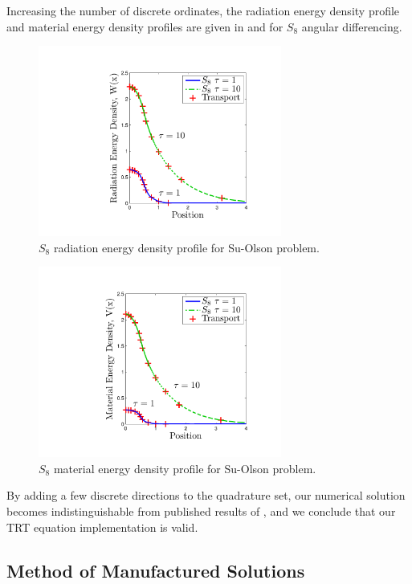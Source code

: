 Increasing the number of discrete ordinates, the radiation energy density profile and material energy density profiles are given in  and  for $S_8$ angular differencing.
\begin{figure}[!htp]
\centering
\includegraphics[width=8cm,trim=1.75in  0.5in 0.75in 0.5in,clip=true]{chapter6_grey_radtran/Dissertation_Data/Su_Olson_S8_Radiation_Energy.pdf}
\caption{$S_8$ radiation energy density profile for Su-Olson problem.}
\label{fig:su_olson_s8_rad}
\end{figure}
\begin{figure}[!htp]
\centering
\includegraphics[width=8cm,trim=1.75in  0.5in 0.75in 0.5in,clip=true]{chapter6_grey_radtran/Dissertation_Data/Su_Olson_S8_Material_Energy.pdf}
\caption{$S_8$ material energy density profile for Su-Olson problem.}
\label{fig:su_olson_s8_mat}
\end{figure}
By adding a few discrete directions to the quadrature set, our numerical solution becomes indistinguishable from published results of \cite{su_olson_1}, and we conclude that our TRT equation implementation is valid.

\newpage

\subsection{Method of Manufactured Solutions}

